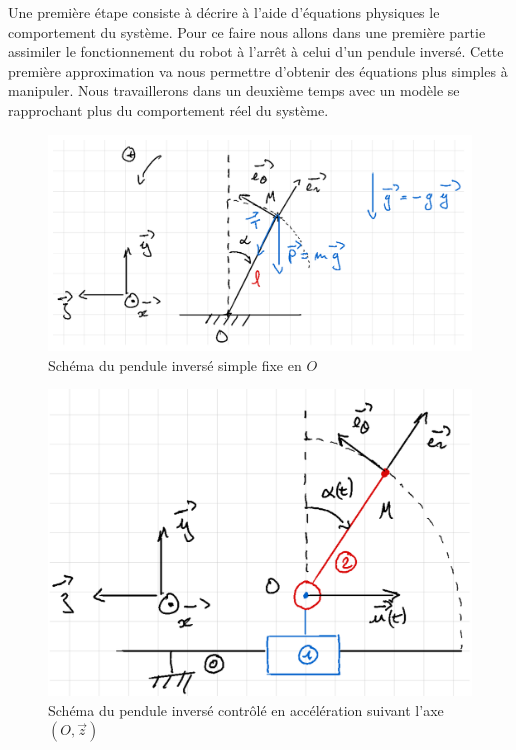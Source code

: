 \documentclass[a4paper]{article}
\begin{document}
                Une première étape consiste à décrire à l'aide d'équations physiques le comportement du système.
                Pour ce faire nous allons dans une première partie assimiler le fonctionnement du robot à l'arrêt à celui d'un pendule inversé.
                Cette première approximation va nous permettre d'obtenir des équations plus simples à manipuler.
                Nous travaillerons dans un deuxième temps avec un modèle se rapprochant plus du comportement réel du système.
                
                \begin{figure}[h!]
                        \centering
                        \includegraphics[scale=0.25]{images/schema_pendule_inverse_fixe.png}
                        \caption{Schéma du pendule inversé simple fixe en $O$}
                        \label{fig_pendule_inverse_fixe}
                \end{figure}

                \begin{figure}[h!]
                        \centering
                        \includegraphics[scale=0.2]{images/schema_pendule_inverse_controle.png}
                        \caption{Schéma du pendule inversé contrôlé en accélération suivant l'axe $(O,\vec{z})$}
                        \label{fig_pendule_inverse_controle}
                \end{figure}
\end{document}
